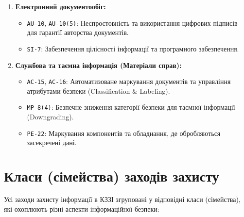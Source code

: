 \documentclass{article}
\begin{document}
\begin{enumerate}
    \item \textbf{Електронний документообіг:}
    \begin{itemize}
        \item \texttt{AU-10}, \texttt{AU-10(5)}: Неспростовність та використання цифрових підписів для гарантії авторства документів.
        \item \texttt{SI-7}: Забезпечення цілісності інформації та програмного забезпечення.
    \end{itemize}

    \item \textbf{Службова та таємна інформація (Матеріали справ):}
    \begin{itemize}
        \item \texttt{AC-15}, \texttt{AC-16}: Автоматизоване маркування документів та управління атрибутами безпеки (Classification \& Labeling).
        \item \texttt{MP-8(4)}: Безпечне зниження категорії безпеки для таємної інформації (Downgrading).
        \item \texttt{PE-22}: Маркування компонентів та обладнання, де обробляються засекречені дані.
    \end{itemize}
\end{enumerate}

\newpage
\section{Класи (сімейства) заходів захисту}
Усі заходи захисту інформації в КЗЗІ згруповані у відповідні класи (сімейства), які охоплюють різні аспекти інформаційної безпеки:
\end{document}
